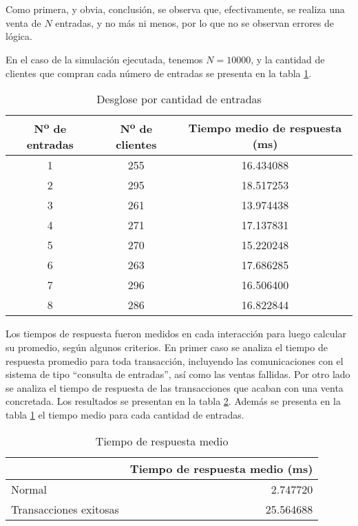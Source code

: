 \section{}

Como primera, y obvia, conclusión, se observa que, efectivamente, se realiza una venta de \(N\) entradas, y no más ni menos,
por lo que no se observan errores de lógica.

En el caso de la simulación ejecutada, tenemos \(N = 10000\), y la cantidad de clientes que compran cada número de entradas
se presenta en la tabla \ref{table:3}.
\begin{table}[H]
\centering
\begin{tabular}{ccc}
	N\textsuperscript{o} de entradas & N\textsuperscript{o} de clientes & Tiempo medio de respuesta (ms)  \\
\hline
1 &  255 & 16.434088\\
2 &  295 & 18.517253 \\
3 &  261 & 13.974438\\
4 &  271 & 17.137831\\
5 &  270 & 15.220248\\
6 &  263 & 17.686285\\
7 &  296 & 16.506400 \\
8 &  286 & 16.822844\\
\end{tabular}
\caption{Desglose por cantidad de entradas}
\label{table:3}
\end{table}


Los tiempos de respuesta fueron medidos en cada interacción para luego calcular su promedio, según algunos criterios.
En primer caso se analiza el tiempo de respuesta promedio para toda transacción,
incluyendo las comunicaciones con el sistema de tipo ``consulta de entradas'', así como las ventas fallidas.
Por otro lado se analiza el tiempo de respuesta de las transacciones que acaban con una venta concretada.
Los resultados se presentan en la tabla \ref{table:2}.
Además se presenta en la tabla \ref{table:3} el tiempo medio para cada cantidad de entradas.

\begin{table}[H]
\centering
\begin{tabular}{l|r}
	{} &  Tiempo de respuesta medio (ms) \\
	\hline
Normal & 2.747720 \\
Transacciones exitosas  & 25.564688 \\
\end{tabular}
\caption{Tiempo de respuesta medio}
\label{table:2}
\end{table}

